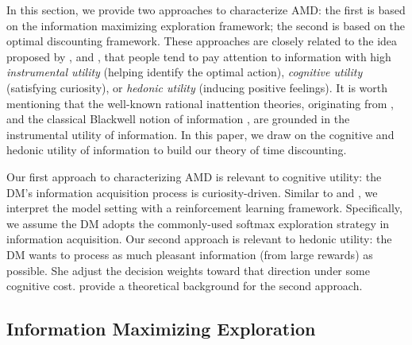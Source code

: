 \documentclass[
  12pt,
]{article}
\begin{document}
In this section, we provide two approaches to characterize AMD: the
first is based on the information maximizing exploration framework; the
second is based on the optimal discounting framework. These approaches
are closely related to the idea proposed by
\citet{gottlieb2012attention}, \citet{gottlieb2013information} and
\citet{sharot2020people}, that people tend to pay attention to
information with high \emph{instrumental utility} (helping identify the
optimal action), \emph{cognitive utility} (satisfying curiosity), or
\emph{hedonic utility} (inducing positive feelings). It is worth
mentioning that the well-known rational inattention theories,
originating from \citet{sims2003implications}, and the classical
Blackwell notion of information \citep{blackwell1951comparison}, are
grounded in the instrumental utility of information. In this paper, we
draw on the cognitive and hedonic utility of information to build our
theory of time discounting.

Our first approach to characterizing AMD is relevant to cognitive
utility: the DM's information acquisition process is curiosity-driven.
Similar to \citet{gottlieb2012attention} and
\citet{gottlieb2013information}, we interpret the model setting with a
reinforcement learning framework. Specifically, we assume the DM adopts
the commonly-used softmax exploration strategy in information
acquisition. Our second approach is relevant to hedonic utility: the DM
wants to process as much pleasant information (from large rewards) as
possible. She adjust the decision weights toward that direction under
some cognitive cost. \citet{noor2022optimal,noor2024constrained} provide
a theoretical background for the second approach.

\hypertarget{information-maximizing-exploration}{%
\subsection{\texorpdfstring{Information Maximizing Exploration
\label{info_max_explor}}{Information Maximizing Exploration }}\label{information-maximizing-exploration}}
\end{document}
